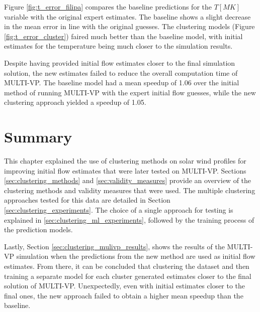 Figure \ref{fig:t_error_filipa} compares the baseline predictions for the $T [MK]$ variable with the original expert estimates. The baseline shows a slight decrease in the mean error in line with the original guesses. The clustering models (Figure \ref{fig:t_error_cluster}) faired much better than the baseline model, with initial estimates for the temperature being much closer to the simulation results.


Despite having provided initial flow estimates closer to the final simulation solution, the new estimates failed to reduce the overall computation time of MULTI-VP. The baseline model had a mean speedup of 1.06 over the initial method of running MULTI-VP with the expert initial flow guesses, while the new clustering approach yielded a speedup of 1.05.


\section{Summary}\label{sec:clustering_summary}
This chapter explained the use of clustering methods on solar wind profiles for improving initial flow estimates that were later tested on MULTI-VP. Sections \ref{sec:clustering_methods} and \ref{sec:validity_measures} provide an overview of the clustering methods and validity measures that were used. The multiple clustering approaches tested for this data are detailed in Section \ref{sec:clustering_experiments}. The choice of a single approach for testing is explained in \ref{sec:clustering_ml_experiments}, followed by the training process of the prediction models.

Lastly, Section \ref{sec:clustering_mulivp_results}, shows the results of the MULTI-VP simulation when the predictions from the new method are used as initial flow estimates. From there, it can be concluded that clustering the dataset and then training a separate model for each cluster generated estimates closer to the final solution of MULTI-VP. Unexpectedly, even with initial estimates closer to the final ones, the new approach failed to obtain a higher mean speedup than the baseline. 